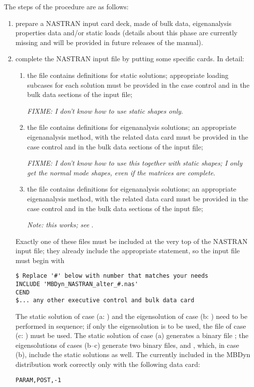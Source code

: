 The steps of the procedure are as follows:
\begin{enumerate} %

\item prepare a NASTRAN input card deck, made of bulk data,
eigenanalysis properties data and/or static loads (details about 
this phase are currently missing and will be provided in future 
releases of the manual).

\item complete the NASTRAN input file by putting some specific
 cards.
In detail:
\begin{enumerate}
\item the file  contains
	 definitions for static solutions; appropriate
	loading subcases for each solution must be provided
	in the case control and in the bulk data sections
	of the input file;

	\emph{FIXME: I don't know how to use static shapes only}.

\item the file  contains
	 definitions for eigenanalysis solutions;
	an appropriate eigenanalysis method, with the related
	data card must be provided in the case control 
	and in the bulk data sections of the input file;

	\emph{FIXME: I don't know how to use this together
		with static shapes; I only get the normal mode shapes,
		even if the matrices are complete}.

\item the file  contains
	 definitions for eigenanalysis solutions;
	an appropriate eigenanalysis method, with the related
	data card must be provided in the case control 
	and in the bulk data sections of the input file;

	\emph{Note: this works; see} .

\end{enumerate}
Exactly one of these files must be included at the very top 
of the NASTRAN input file;
they already include the appropriate  statement, so the
input file must begin with
\begin{verbatim}
$ Replace '#' below with number that matches your needs
INCLUDE 'MBDyn_NASTRAN_alter_#.nas'
CEND
$... any other executive control and bulk data card
\end{verbatim}
The static solution of case (a: ) and the eigensolution
of case (b: ) need to be performed in sequence; 
if only the eigensolution is to be used, the  file 
of case (c: ) must be used.
The static solution of case (a) generates a binary file ;
the eigensolutions of cases (b--c) generate two binary files, 
 and , which, in case (b), include
the static solutions as well.
The  currently included in the MBDyn distribution work 
correctly only with the following  data card:
\begin{verbatim}
PARAM,POST,-1 
\end{verbatim}



\end{enumerate}
